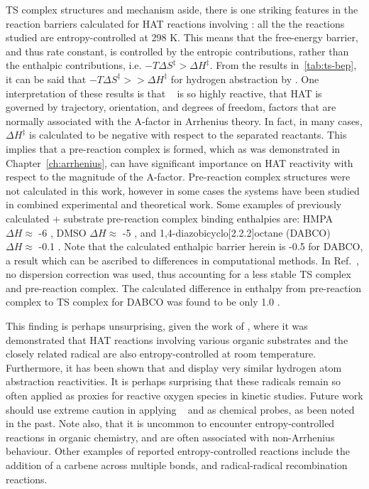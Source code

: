 TS complex structures and mechanism aside, there is one striking features in the reaction barriers calculated for HAT reactions involving \cumo: all the the reactions studied are entropy-controlled at 298 K. This means that the free-energy barrier, and thus rate constant, is controlled by the entropic contributions, rather than the enthalpic contributions, i.e. $-T\Delta S^\ddagger > \Delta H^\ddagger$. From the results in~\ref{tab:ts-bep}, it can be said that $-T\Delta S^\ddagger >> \Delta H^\ddagger$ for hydrogen abstraction by \cumo. One interpretation of these results is that \cumo~ is so highly reactive, that HAT is governed by trajectory, orientation, and degrees of freedom, factors that are normally associated with the A-factor in Arrhenius theory. In fact, in many cases, $\Delta H^\ddagger$ is calculated to be negative with respect to the separated reactants. This implies that a pre-reaction complex is formed, which as was demonstrated in Chapter~\ref{ch:arrhenius}, can have significant importance on HAT reactivity with respect to the magnitude of the A-factor. Pre-reaction complex structures were not calculated in this work, however  in some cases the systems have been studied in combined experimental and theoretical work. Some examples of previously calculated \cumo + substrate pre-reaction complex binding enthalpies are: HMPA\footnotemark\ $\Delta H \approx$ -6 \kcalmol, DMSO $\Delta H \approx$ -5 \kcalmol, and 1,4-diazobicyclo[2.2.2]octane (DABCO)\cite{Salamone2011b} $\Delta H \approx$ -0.1 \kcalmol. Note that the calculated enthalpic barrier herein is -0.5 \kcalmol for DABCO, a result which can be ascribed to differences in computational methods. In Ref.~, no dispersion correction was used, thus accounting for a less stable TS complex and pre-reaction complex. The calculated difference in enthalpy from pre-reaction complex to TS complex for DABCO was found to be only 1.0 \kcalmol.


This finding is perhaps unsurprising, given the work of \citet{Finn2004}, where it was demonstrated that HAT reactions involving various organic substrates and the closely related radical  are also entropy-controlled at room temperature. Furthermore, it has been shown that \cumo and  display very similar hydrogen atom abstraction reactivities.\cite{Salamone2011, Valgimigli1995, Sheeller2001, Baignee1983} It is perhaps surprising that these radicals remain so often applied as proxies for reactive oxygen species in kinetic studies. Future work should use extreme caution in applying \cumo~ and  as chemical probes, as been noted in the past.\cite{Finn2004, Salamone2011b, Salamone2011} Note also, that it is uncommon to encounter entropy-controlled reactions in organic chemistry, and are often associated with non-Arrhenius behaviour. Other examples of reported entropy-controlled reactions include the addition of a carbene across multiple bonds,\cite{Houk1984, Moss2017} and radical-radical recombination reactions.\cite{Sobek2001}

